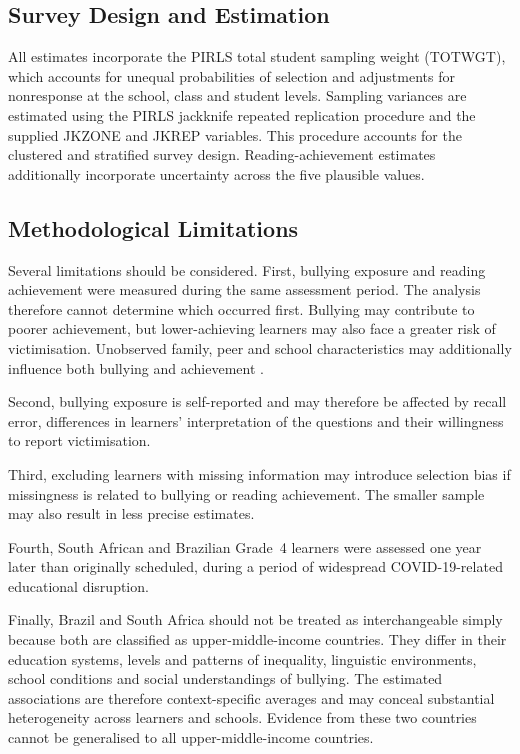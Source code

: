 \subsection{Survey Design and Estimation}

All estimates incorporate the PIRLS total student sampling weight (TOTWGT), which accounts for unequal probabilities of selection and adjustments for nonresponse at the school, class and student levels. Sampling variances are estimated using the PIRLS jackknife repeated replication procedure and the supplied JKZONE and JKREP variables. This procedure accounts for the clustered and stratified survey design. Reading-achievement estimates additionally incorporate uncertainty across the five plausible values.

\subsection{Methodological Limitations}

Several limitations should be considered. First, bullying exposure and
reading achievement were measured during the same assessment period. The
analysis therefore cannot determine which occurred first. Bullying may
contribute to poorer achievement, but lower-achieving learners may also
face a greater risk of victimisation. Unobserved family, peer and school
characteristics may additionally influence both bullying and achievement
\citep{anton_erxleben2016bullying}.

Second, bullying exposure is self-reported and may therefore be affected
by recall error, differences in learners' interpretation of the questions
and their willingness to report victimisation.

Third, excluding learners with missing information may introduce
selection bias if missingness is related to bullying or reading
achievement. The smaller sample may also result in less precise estimates.

Fourth, South African and Brazilian Grade~4 learners were assessed one
year later than originally scheduled, during a period of widespread
COVID-19-related educational disruption.

Finally, Brazil and South Africa should not be treated as interchangeable
simply because both are classified as upper-middle-income countries. They
differ in their education systems, levels and patterns of inequality,
linguistic environments, school conditions and social understandings of
bullying. The estimated associations are therefore context-specific
averages and may conceal substantial heterogeneity across learners and
schools. Evidence from these two countries cannot be generalised to all
upper-middle-income countries.
